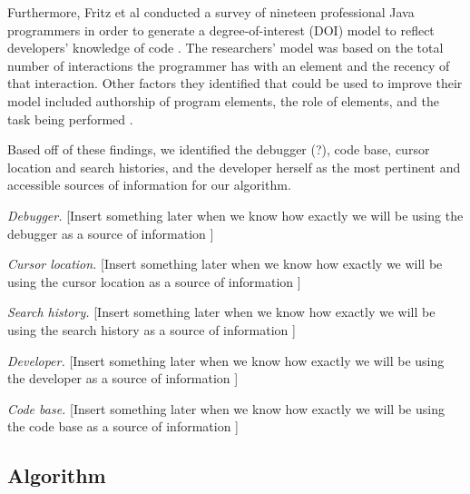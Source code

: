 \documentclass[12pt]{article}
\begin{document}
Furthermore, Fritz et al conducted a survey of nineteen professional Java programmers in order to generate a degree-of-interest (DOI) model to reflect developers' knowledge of code \cite{FritzEtAl2007}. The researchers' model was based on the total number of interactions the programmer has with an element and the recency of that interaction. Other factors they identified that could be used to improve their model included authorship of program elements, the role of elements, and the task being performed \cite{FritzEtAl2007}.

Based off of  these findings, we identified the debugger (?), code base, cursor location and search histories, and the developer herself as the most pertinent and accessible sources of information for our algorithm.

\textit{Debugger.} [Insert something later when we know how exactly we will be using the debugger as a source of information ]

\textit{Cursor location.} [Insert something later when we know how exactly we will be using the cursor location as a source of information ]

\textit{Search history.} [Insert something later when we know how exactly we will be using the search history as a source of information ]

\textit{Developer.} [Insert something later when we know how exactly we will be using the developer as a source of information ]

\textit{Code base.} [Insert something later when we know how exactly we will be using the code base as a source of information ]



\subsection{Algorithm} \label{algm}
\end{document}
